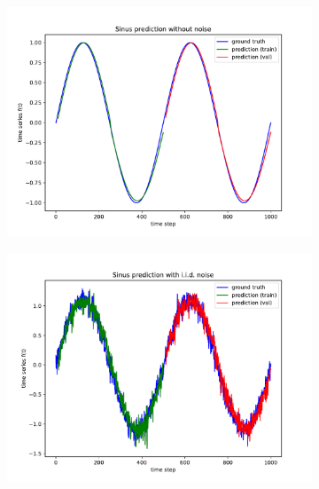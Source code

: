 \documentclass{article}
\begin{document}
\begin{figure}
  \begin{subfigure}{.35\textwidth}
    \centering
    \includegraphics[width=\linewidth]{figures/plot_twolayer_noiseless.pdf}
  \end{subfigure} 
  \hspace{-5mm}
  \begin{subfigure}{.35\textwidth}
    \centering
    \includegraphics[width=\linewidth]{figures/plot_twolayer_iidnoise.pdf}
  \end{subfigure} 
  \hspace{-5mm}
  \begin{subfigure}{.35\textwidth}
    \centering

\end{subfigure}
\end{figure}
\end{document}
